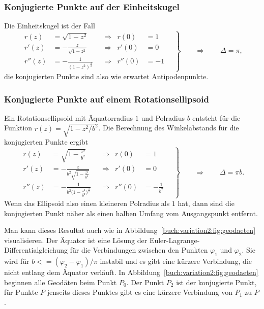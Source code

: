 \subsubsection{Konjugierte Punkte auf der Einheitskugel}
Die Einheitskugel ist der Fall
\begin{equation}
\left.
\begin{aligned}
r(z)
&=
\sqrt{1-z^2}
&&\Rightarrow&
r(0)&=1
\\
r'(z)
&=
-
\frac{z}{\sqrt{1-z^2}}
&&\Rightarrow&
r'(0)&=0
\\
r''(z)
&=
-
\frac{1}{(1-z^2)^{\frac32}}
&&\Rightarrow&
r''(0)&=-1
\end{aligned}
\quad
\right\}
\qquad\Rightarrow\qquad
\Delta
=
\pi,
\end{equation}
die konjugierten Punkte sind also wie erwartet Antipodenpunkte.

%
%
\subsubsection{Konjugierte Punkte auf einem Rotationsellipsoid}
Ein Rotationsellipsoid mit Äquatorradius $1$ und Polradius $b$
entsteht für die Funktion $r(z)=\sqrt{1-z^2/b^2}$.
Die Berechnung des Winkelabstands für die konjugierten Punkte
ergibt
\begin{equation}
\left.
\begin{aligned}
r(z) &= \sqrt{1-\frac{z^2}{b^2}}
&&\Rightarrow&
r(0) &= 1
\\
r'(z) &= -\frac{z}{\displaystyle b^2\sqrt{1-\frac{z^2}{b^2}}}
&&\Rightarrow&
r'(0) &= 0
\\
r''(z)
&=
-\frac{1}{b^2\biggl(\displaystyle1-\frac{z^2}{b^2}\biggr)^{\frac32}}
&&\Rightarrow&
r''(0) &= -\frac{1}{b^2}
\end{aligned}
\quad
\right\}
\qquad\Rightarrow\qquad
\Delta
=
\pi b.
\end{equation}
Wenn das Ellipsoid also einen kleineren Polradius als $1$ hat, dann
sind die konjugierten Punkt näher als einen halben Umfang vom
Ausgangspunkt entfernt.

Man kann dieses Resultat auch wie in
Abbildung~\ref{buch:variation2:fig:geodaeten} visualisieren.
%
Der Äquator ist eine Lösung der Euler-Lagrange-Differentialgleichung
für die Verbindungen zwischen den Punkten $\varphi_1$ und $\varphi_2$.
Sie wird für $b <= (\varphi_2-\varphi_1)/\pi$ instabil und es gibt
eine kürzere Verbindung, die nicht entlang dem Äquator verläuft.
In Abbildung~\ref{buch:variation2:fig:geodaeten} beginnen alle
Geodäten beim Punkt $P_0$.
Der Punkt $P_2$ ist der konjugierte Punkt, für Punkte $P$ jenseits dieses
Punktes gibt es eine kürzere Verbindung von $P_1$ zu $P$.


